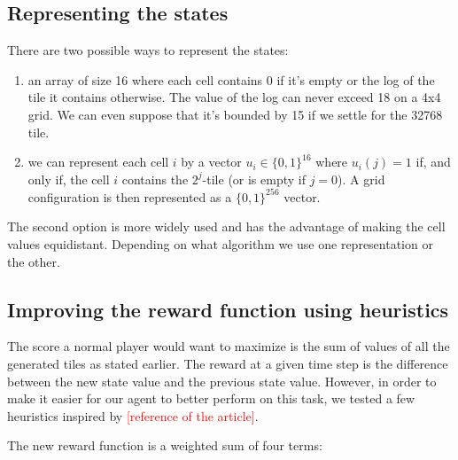 \documentclass[journal, a4paper]{IEEEtran}
\newcommand\todo[1]{\textcolor{red}{#1}}
\begin{document}
\subsection*{Representing the states} 
There are two possible ways to represent the states:
\begin{enumerate}
    \item an array of size 16 where each cell contains 0 if it's empty or the log of the tile it contains otherwise. The value of the log can never exceed 18 on a 4x4 grid. We can even suppose that it's bounded by 15 if we settle for the 32768 tile.
    \item we can represent each cell $i$ by a vector $u_i \in \{0,1\}^{16}$ where $u_i(j) = 1$ if, and only if, the cell $i$ contains the $2^j$-tile (or is empty if $j = 0$). A grid configuration is then represented as a $\{0,1\}^{256}$ vector.
\end{enumerate}
The second option is more widely used and has the advantage of making the cell values equidistant. Depending on what algorithm we use one representation or the other.

\subsection*{Improving the reward function using heuristics}
The score a normal player would want to maximize is the sum of values of all the generated tiles as stated earlier.
The reward at a given time step is the difference between the new state value and the previous state value.
However, in order to make it easier for our agent to better perform on this task, we tested a few heuristics inspired by \todo{[reference of the article]}. 

The new reward function is a weighted sum of four terms:
\end{document}
